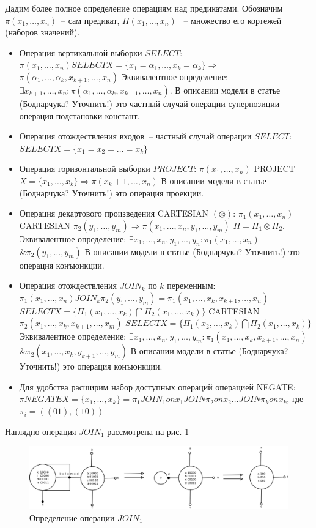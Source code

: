 \documentclass[12pt]{article}
\begin{document}
Дадим более полное определение операциям над предикатами.
Обозначим $\pi(x_1, \dots, x_n)$~-- сам предикат, $\Pi(x_1, \dots, x_n)$ ~-- множество его кортежей (наборов значений).
\begin{itemize}
\item Операция вертикальной выборки $SELECT$:
$\pi(x_1, \dots, x_n) SELECT X=\{x_1=\alpha_1, \ldots, x_k=\alpha_k\} \Longrightarrow$
$\pi(\alpha_1, \dots, \alpha_k, x_{k+1}, \dots, x_n)$
Эквивалентное определение: $\exists x_{k+1}, \dots, x_n: \pi(\alpha_1, \dots, \alpha_k, x_{k+1}, \dots, x_n)$. 
В описании модели в статье (Боднарчука? Уточнить!) это частный случай операции суперпозиции~-- операция подстановки констант.
\item Операция отождествления входов~-- частный случай операции $SELECT$: $SELECT X=\{x_1=x_2=\dots=x_k\}$
\item Операция горизонтальной выборки $PROJECT$:
$\pi(x_1, \dots, x_n)$ PROJECT $X=\{x_1, \dots, x_k\} \Longrightarrow \pi(x_k+1, \dots, x_n)$
В описании модели в статье (Боднарчука? Уточнить!) это операция проекции.
\item Операция декартового произведения CARTESIAN $(\otimes)$:
$\pi_1(x_1, \dots, x_n)$ CARTESIAN $\pi_2(y_1, \dots, y_m) \Longrightarrow \pi(x_1, \dots, x_n, y_1, \dots, y_m)$
$\Pi = \Pi_1 \otimes\Pi_2$.
Эквивалентное определение: $\exists x_1, \dots, x_n, y_1, \dots, y_n: \pi_1(x_{1}, \dots, x_n)$
$\& \pi_2(y_1, \dots, y_m)$
В описании модели в статье (Боднарчука? Уточнить!) это операция конъюнкции.
\item Операция отождествления $JOIN_k$ по $k$ переменным:
$\pi_1(x_1, \dots, x_n) JOIN_k \pi_2(y_1, \dots, y_m) = \pi_1(x_1, \dots, x_k, x_{k+1}, \dots, x_n)$
$SELECT X=\{\Pi_1(x_1, \dots, x_k) \bigcap \Pi_2(x_1, \dots, x_k)\}$ CARTESIAN $\pi_2(x_1, \dots, x_k, x_{k+1}, \dots, x_m)$
$SELECT X=\{\Pi_1(x_2, \dots, x_k) \bigcap  \Pi_2(x_1, \dots, x_k)\}$ 
Эквивалентное определение: $\exists x_1, \dots, x_n, y_1, \dots, y_m: \pi_1(x_{1}, \dots, x_k, x_{k+1}, \dots, x_n)$
$\& \pi_2(x_1, \dots, x_k, y_{k+1}, \dots, y_m)$
В описании модели в статье (Боднарчука? Уточнить!) это операция конъюнкции.
\item Для удобства расширим набор доступных операций операцией NEGATE: 
$\pi NEGATE X=\{x_1, \dots, x_k\} = \pi_1 JOIN_1 on x_1 JOIN \pi_2 on x_2 \dots JOIN \pi_k on x_k$, где $\pi_i = ((01), (10))$
\end{itemize}
Наглядно операция $JOIN_1$ рассмотрена на рис. \ref{fig:join}
\begin{figure}[htb]
\centering
\includegraphics[width=1.0\textwidth]{join.png}
\caption{Определение операции $JOIN_1$}
\label{fig:join}
\end{figure}
\end{document}
